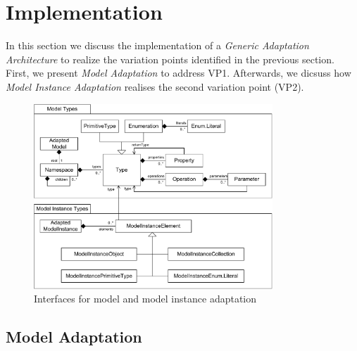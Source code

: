 \section{Implementation}
\label{sec:implementation}
	In this section we discuss the implementation of a \emph{Generic Adaptation
	Architecture} to realize the
	variation points identified in the previous section. First, we present
	\emph{Model Adaptation} to address VP1. Afterwards, we dicsuss how \emph{Model
	Instance Adaptation} realises the second variation point (VP2).
	
	\begin{figure}[!t]
			\centering
				\includegraphics[width=0.80\textwidth]{figures/coreconcepts.pdf}
			\caption{
			Interfaces for model and model instance adaptation
			}
			\label{fig:coreconcepts}
		\end{figure}

\subsection{Model Adaptation}

